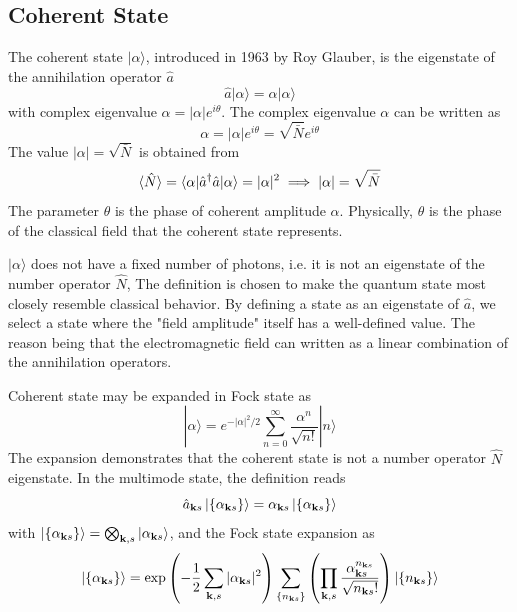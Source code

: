 \documentclass[../../../main.tex]{subfiles}
\begin{document}
\subsection{Coherent State}
The coherent state $|\alpha\rangle$, introduced in 1963 by Roy Glauber, is the eigenstate of the annihilation operator $\hat{a}$
\begin{equation*}
  \hat{a}|\alpha\rangle = \alpha|\alpha\rangle
\end{equation*}
with complex eigenvalue $\alpha = |\alpha|e^{i\theta}$.
The complex eigenvalue $\alpha$ can be written as
\begin{equation*}
  \alpha = |\alpha| e^{i\theta}=\sqrt{\bar{N} }e^{i\theta}
\end{equation*}
The value $|\alpha|=\sqrt{\bar{N}}$ is obtained from
\begin{equation*}
  \braket{\hat{N}  } =\braket{\alpha  | \hat{a}^\dagger \hat{a}|\alpha }=|\alpha|^2\implies |\alpha|=\sqrt{\bar{N}}
\end{equation*}
The parameter $\theta$ is the phase of coherent amplitude $\alpha$.
Physically, $\theta$ is the phase of the classical field that the coherent state represents.

$|\alpha\rangle$ does not have a fixed number of photons, i.e. it is not an eigenstate of the number operator $\hat{N}$,
The definition is chosen to make the quantum state most closely resemble classical behavior.
By defining a state as an eigenstate of $\hat{a}$, we select a state where the "field amplitude" itself has a well-defined value.
The reason being that the electromagnetic field can written as a linear combination of the annihilation operators.

Coherent state may be expanded in Fock state as
\begin{equation*}
  |\alpha\rangle = e^{-|\alpha|^2/2} \sum_{n=0}^{\infty} \frac{\alpha^n}{\sqrt{n!}} |n\rangle
\end{equation*}
The expansion demonstrates that the coherent state is not a number operator $\hat{N}$ eigenstate.
In the multimode state, the definition reads
\begin{equation*}
  \hat{a}_{\mathbf{k }s} \ket{\left\{ \alpha_{\mathbf{k }s} \right\} }=\alpha_{\mathbf{k }s} \ket{\left\{ \alpha_{\mathbf{k }s} \right\} }
\end{equation*}
with $  \ket{\left\{ \alpha_{\mathbf{k }s} \right\} } = \bigotimes_{\mathbf{k},s} \ket{\alpha_{\mathbf{k }s}}$, and the Fock state expansion as
\begin{equation*}
  | \{ \alpha_{\mathbf{k }s} \} \rangle
  =
  \exp\left(-\frac{1}{2} \sum_{\mathbf{k},s} |\alpha_{\mathbf{k }s}|^2\right) \sum_{\{ n_{\mathbf{k }s} \}} \left( \prod_{\mathbf{k},s} \frac{\alpha_{\mathbf{k }s}^{n_{\mathbf{k }s}}}{\sqrt{n_{\mathbf{k }s}!}} \right) \ket{\{ n_{\mathbf{k }s} \}}
\end{equation*}
\end{document}
